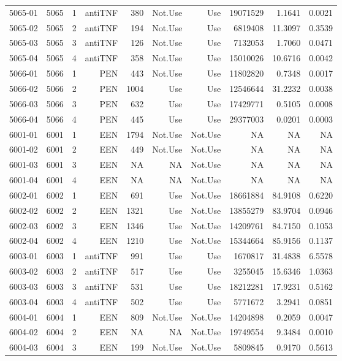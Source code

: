 {\begin{longtable}{ | r | r | r | r | r | r | r | r | r | r | }
5065-01 & 5065 & 1 & antiTNF & 380 & Not.Use & Use & 19071529 & 1.1641 & 0.0021\\ 
5065-02 & 5065 & 2 & antiTNF & 194 & Not.Use & Use & 6819408 & 11.3097 & 0.3539\\ 
5065-03 & 5065 & 3 & antiTNF & 126 & Not.Use & Use & 7132053 & 1.7060 & 0.0471\\ 
5065-04 & 5065 & 4 & antiTNF & 358 & Not.Use & Use & 15010026 & 10.6716 & 0.0042\\ 
5066-01 & 5066 & 1 & PEN & 443 & Not.Use & Use & 11802820 & 0.7348 & 0.0017\\ 
5066-02 & 5066 & 2 & PEN & 1004 & Use & Use & 12546644 & 31.2232 & 0.0038\\ 
5066-03 & 5066 & 3 & PEN & 632 & Use & Use & 17429771 & 0.5105 & 0.0008\\ 
5066-04 & 5066 & 4 & PEN & 445 & Use & Use & 29377003 & 0.0201 & 0.0003\\ 
6001-01 & 6001 & 1 & EEN & 1794 & Not.Use & Not.Use & NA & NA & NA\\ 
6001-02 & 6001 & 2 & EEN & 449 & Not.Use & Not.Use & NA & NA & NA\\ 
6001-03 & 6001 & 3 & EEN & NA & NA & Not.Use & NA & NA & NA\\ 
6001-04 & 6001 & 4 & EEN & NA & NA & Not.Use & NA & NA & NA\\ 
6002-01 & 6002 & 1 & EEN & 691 & Use & Not.Use & 18661884 & 84.9108 & 0.6220\\ 
6002-02 & 6002 & 2 & EEN & 1321 & Use & Not.Use & 13855279 & 83.9704 & 0.0946\\ 
6002-03 & 6002 & 3 & EEN & 1346 & Use & Not.Use & 14209761 & 84.7150 & 0.1053\\ 
6002-04 & 6002 & 4 & EEN & 1210 & Use & Not.Use & 15344664 & 85.9156 & 0.1137\\ 
6003-01 & 6003 & 1 & antiTNF & 991 & Use & Use & 1670817 & 31.4838 & 6.5578\\ 
6003-02 & 6003 & 2 & antiTNF & 517 & Use & Use & 3255045 & 15.6346 & 1.0363\\ 
6003-03 & 6003 & 3 & antiTNF & 531 & Use & Use & 18212281 & 17.9231 & 0.5162\\ 
6003-04 & 6003 & 4 & antiTNF & 502 & Use & Use & 5771672 & 3.2941 & 0.0851\\ 
6004-01 & 6004 & 1 & EEN & 809 & Not.Use & Not.Use & 14204898 & 0.2059 & 0.0047\\ 
6004-02 & 6004 & 2 & EEN & NA & NA & Not.Use & 19749554 & 9.3484 & 0.0010\\ 
6004-03 & 6004 & 3 & EEN & 199 & Not.Use & Not.Use & 5809845 & 0.9170 & 0.5613\\ 

\end{longtable}}
